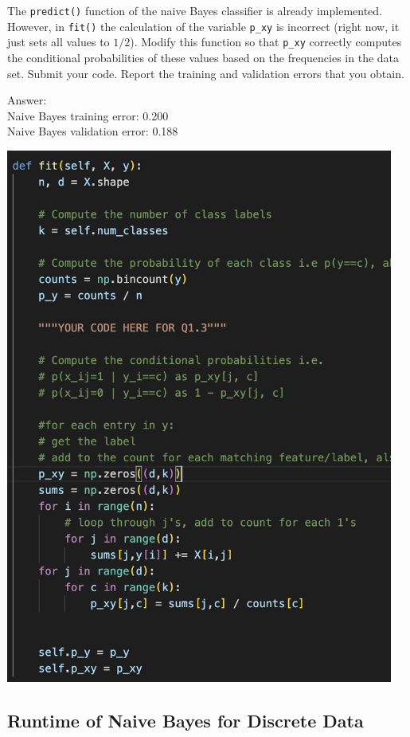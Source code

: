 \documentclass{article}
\def\ans#1{\par\gre{Answer: #1}}
\def\blu#1{{\color{blu}#1}}
\def\gre#1{{\color{gre}#1}}
\let\ask\blu
\begin{document}
    The \texttt{predict()} function of the naive Bayes classifier is already implemented.
    However, in \texttt{fit()}
    the calculation of the variable \texttt{p\_xy} is incorrect
    (right now, it just sets all values to $1/2$).
    \ask{Modify this function so that \texttt{p\_xy} correctly
        computes the conditional probabilities of these values based on the
        frequencies in the data set. Submit your code. Report the training and validation errors that you obtain.}
\ans{\\
Naive Bayes training error: 0.200
\\
Naive Bayes validation error: 0.188
}
\begin{center}
      \includegraphics[height=500pt]{1.3.png}
  \end{center}


\pagebreak

\subsection{Runtime of Naive Bayes for Discrete Data}
\end{document}
